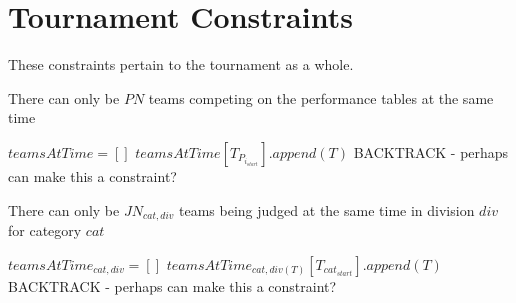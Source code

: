 \documentclass[letterpaper,11pt]{report}
\begin{document}
\section{Tournament Constraints}
These constraints pertain to the tournament as a whole.

\begin{algorithm}
\caption{There can only be $PN$ teams competing on the performance tables
at the same time}
\begin{algorithmic}

\STATE $teamsAtTime = []$
    \STATE $teamsAtTime[T_{P_{i_{start}}}].append(T)$
  \ENDFOR
      \STATE BACKTRACK - perhaps can make this a constraint?
    \ENDIF
  \ENDFOR
\ENDFOR

\end{algorithmic}
\end{algorithm}

\begin{algorithm}
\caption{There can only be $JN_{cat,div}$ teams being judged at the same
time in division $div$ for category $cat$}
\begin{algorithmic}
    \STATE $teamsAtTime_{cat,div} = []$
  \ENDFOR
    \STATE $teamsAtTime_{cat,div(T)}[T_{cat_{start}}].append(T)$
  \ENDFOR
        \STATE BACKTRACK - perhaps can make this a constraint?
      \ENDIF
    \ENDFOR
  \ENDFOR
\ENDFOR
\end{algorithmic}
\end{algorithm}
\end{document}
